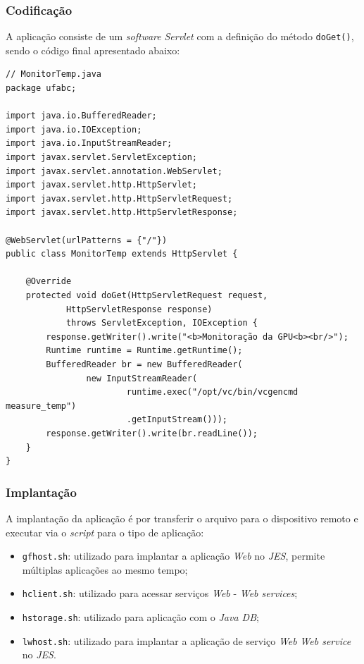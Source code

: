 \subsubsection{Codificação}

A aplicação consiste de um \textit{software} \textit{Servlet} com a definição
do método \verb|doGet()|, sendo o código final apresentado abaixo:

\begin{verbatim}
// MonitorTemp.java
package ufabc;

import java.io.BufferedReader;
import java.io.IOException;
import java.io.InputStreamReader;
import javax.servlet.ServletException;
import javax.servlet.annotation.WebServlet;
import javax.servlet.http.HttpServlet;
import javax.servlet.http.HttpServletRequest;
import javax.servlet.http.HttpServletResponse;

@WebServlet(urlPatterns = {"/"})
public class MonitorTemp extends HttpServlet {

    @Override
    protected void doGet(HttpServletRequest request,
            HttpServletResponse response)
            throws ServletException, IOException {
        response.getWriter().write("<b>Monitoração da GPU<b><br/>");
        Runtime runtime = Runtime.getRuntime();
        BufferedReader br = new BufferedReader(
                new InputStreamReader(
                        runtime.exec("/opt/vc/bin/vcgencmd measure_temp")
                        .getInputStream()));
        response.getWriter().write(br.readLine());
    }
}
\end{verbatim}

\subsubsection{Implantação}

A implantação da aplicação é por transferir o arquivo para o dispositivo remoto
e executar via o \textit{script} para o tipo de aplicação:

\begin{itemize}

    \item \verb|gfhost.sh|: utilizado para implantar a aplicação \textit{Web}
    no \textit{JES}, permite múltiplas aplicações ao mesmo tempo;

    \item \verb|hclient.sh|: utilizado para acessar serviços \textit{Web} -
    \textit{Web services};

    \item \verb|hstorage.sh|: utilizado para aplicação com o \textit{Java DB};

    \item \verb|lwhost.sh|: utilizado para implantar a aplicação de serviço
      \textit{Web} \textit{Web service} no \textit{JES}.

\end{itemize}

